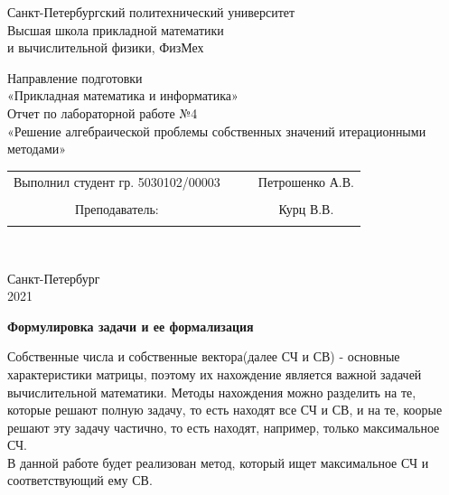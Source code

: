 \documentclass{article}
\begin{document}
	\begin{center}
		\hfill \break
		\begin{center}
			\huge{Санкт-Петербургский политехнический университет\\
				Высшая школа прикладной математики\\
				и вычислительной физики, ФизМех}
		\end{center}
		\hfill \break
		\hfill \break
		\hfill \break
		\hfill \break
		\hfill \break
		\huge{Направление подготовки\\
			«Прикладная математика и информатика»}\\
		\hfill \break
		\hfill \break
		\hfill \break
		\hfill \break
		\hfill \break
		\hfill \break
		\fontsize{14pt}{14pt}\selectfont
		Отчет по лабораторной работе №4\\
		«Решение алгебраической проблемы собственных значений итерационными методами»\\
		\hfill \break
		\hfill \break
		\hfill \break
		\hfill \break
		\hfill \break
	\end{center}
	\hfill \break
	\hfill \break
	\fontsize{12pt}{12pt}\selectfont
	\begin{tabular}{cccc}
		\hspace{1cm}Выполнил студент гр. 5030102/00003 & {\hspace{3cm}} & & Петрошенко А.В. \\\\
		\hspace{-3cm}Преподаватель: &{\hspace{1cm}}& & {\hspace{1cm}} Курц В.В. \\\\
	\end{tabular}\\
	\hfill \break
	\hfill \break
	\hfill \break
	\hfill \break
	\hfill \break
	\hfill \break
	\begin{center} Санкт-Петербург\\ 
		2021\\
	\end{center}
	\thispagestyle{empty}
	\newpage
	\begin{center} \textbf{Формулировка задачи и ее формализация}\end{center}
	Собственные числа и собственные вектора(далее СЧ и СВ) - основные характеристики матрицы, поэтому их нахождение является важной задачей вычислительной математики. Методы нахождения можно разделить на те, которые решают полную задачу, то есть находят все СЧ и СВ, и на те, коорые решают эту задачу частично, то есть находят, например, только максимальное СЧ.\\ В данной работе будет реализован метод, который ищет максимальное СЧ и соответствующий ему СВ.\\
\end{document}
